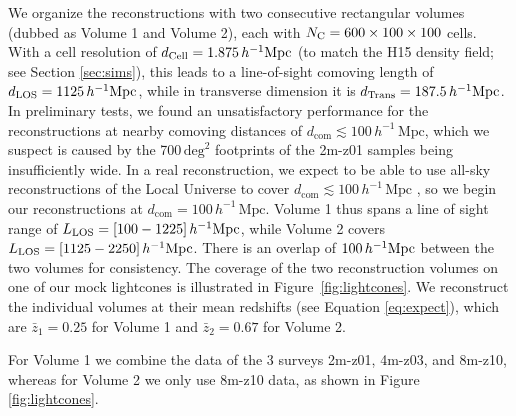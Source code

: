\documentclass[twocolumn]{aastex63}
\newcommand{\hmpc}{\ensuremath{h^{-1}\,\mathrm{Mpc}}}
\begin{document}
\begin{CJK*}{UTF8}{gbsn}
We organize the reconstructions with two consecutive rectangular volumes (dubbed as Volume 1 and Volume 2), each with $N_{\rm C} = 600\times 100 \times 100$ cells. 
With a cell resolution of $d_{\rm Cell} = 1.875 \,h^{-1} \rm Mpc$ (to match the H15 density field; see Section \ref{sec:sims}),
this leads to a line-of-sight comoving length of $d_{\rm LOS} = 1125 \,h^{-1} \rm Mpc$, while in transverse dimension it is $d_{\rm Trans} = 187.5 \,h^{-1} \rm Mpc$. 
In preliminary tests, we found an unsatisfactory performance for the reconstructions at nearby comoving distances of $d_\mathrm{com} \lesssim 100\,\hmpc$, which 
we suspect is caused by the 700$\,\mathrm{deg}^2$ footprints of the 2m-z01 samples being insufficiently wide. In a real reconstruction, 
we expect to be able to use all-sky reconstructions of the Local Universe to cover $d_\mathrm{com} \lesssim 100\,\hmpc$ \citep[e.g.,][]{erdogdu:2006},
so we begin our reconstructions at $d_\mathrm{com} = 100\,\hmpc$.
Volume 1 thus spans a line of sight range of $L_{\rm LOS} =  [100 - 1225] \,h^{-1} \rm Mpc$, while Volume 2 covers $L_{\rm LOS} = [1125 - 2250] \,h^{-1} \rm Mpc$. There is an overlap of $ 100 \,h^{-1} \rm Mpc$ between the two volumes for consistency. {The coverage of the two reconstruction
volumes on one of our mock lightcones is illustrated in Figure~\ref{fig:lightcones}}.
We reconstruct the individual volumes at their mean redshifts (see Equation \ref{eq:expect}), which are $\bar{z}_1 = 0.25$ for Volume 1 and $\bar{z}_2 = 0.67$ for Volume 2.

For Volume 1 we combine the data of the 3 surveys 2m-z01, 4m-z03, and 8m-z10, whereas for Volume 2 we only use 8m-z10 data, as shown in Figure \ref{fig:lightcones}.



\end{CJK*}
\end{document}
